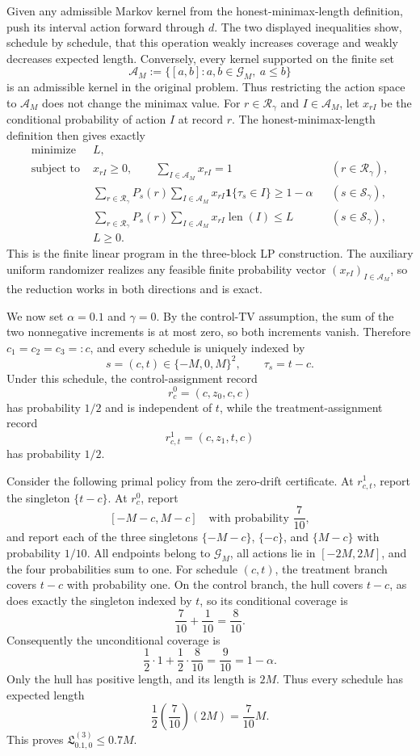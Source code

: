 Given any admissible Markov kernel from the honest-minimax-length definition, push its interval action forward through \(d\).  The two displayed inequalities show, schedule by schedule, that this operation weakly increases coverage and weakly decreases expected length.  Conversely, every kernel supported on the finite set
\[
\mathcal A_M:=\{[a,b]:a,b\in\mathcal G_M,\ a\le b\}
\]
is an admissible kernel in the original problem.  Thus restricting the action space to \(\mathcal A_M\) does not change the minimax value.  For \(r\in\mathcal R_\gamma\) and \(I\in\mathcal A_M\), let \(x_{rI}\) be the conditional probability of action \(I\) at record \(r\).  The honest-minimax-length definition then gives exactly
\[
\begin{aligned}
\text{minimize }&L,\\
\text{subject to }&x_{rI}\ge0,\qquad \sum_{I\in\mathcal A_M}x_{rI}=1 &&(r\in\mathcal R_\gamma),\\
&\sum_{r\in\mathcal R_\gamma}P_s(r)\sum_{I\in\mathcal A_M}x_{rI}\mathbf 1\{\tau_s\in I\}\ge1-\alpha &&(s\in\mathcal S_\gamma),\\
&\sum_{r\in\mathcal R_\gamma}P_s(r)\sum_{I\in\mathcal A_M}x_{rI}\operatorname{len}(I)\le L &&(s\in\mathcal S_\gamma),\\
&L\ge0.
\end{aligned}
\]
This is the finite linear program in the three-block LP construction.  The auxiliary uniform randomizer realizes any feasible finite probability vector \((x_{rI})_{I\in\mathcal A_M}\), so the reduction works in both directions and is exact.

We now set \(\alpha=0.1\) and \(\gamma=0\).  By the control-TV assumption, the sum of the two nonnegative increments is at most zero, so both increments vanish.  Therefore \(c_1=c_2=c_3=:c\), and every schedule is uniquely indexed by
\[
s=(c,t)\in\{-M,0,M\}^{2},\qquad \tau_s=t-c.
\]
Under this schedule, the control-assignment record
\[
r_c^0=(c,z_0,c,c)
\]
has probability \(1/2\) and is independent of \(t\), while the treatment-assignment record
\[
r_{c,t}^1=(c,z_1,t,c)
\]
has probability \(1/2\).

Consider the following primal policy from the zero-drift certificate.  At \(r_{c,t}^1\), report the singleton \(\{t-c\}\).  At \(r_c^0\), report
\[
[-M-c,M-c]\quad\text{with probability }\frac7{10},
\]
and report each of the three singletons \(\{-M-c\}\), \(\{-c\}\), and \(\{M-c\}\) with probability \(1/10\).  All endpoints belong to \(\mathcal G_M\), all actions lie in \([-2M,2M]\), and the four probabilities sum to one.  For schedule \((c,t)\), the treatment branch covers \(t-c\) with probability one.  On the control branch, the hull covers \(t-c\), as does exactly the singleton indexed by \(t\), so its conditional coverage is
\[
\frac7{10}+\frac1{10}=\frac8{10}.
\]
Consequently the unconditional coverage is
\[
\frac12\cdot1+\frac12\cdot\frac8{10}=\frac9{10}=1-\alpha.
\]
Only the hull has positive length, and its length is \(2M\).  Thus every schedule has expected length
\[
\frac12\left(\frac7{10}\right)(2M)=\frac7{10}M.
\]
This proves \(\mathfrak L^{(3)}_{0.1,0}\le0.7M\).

